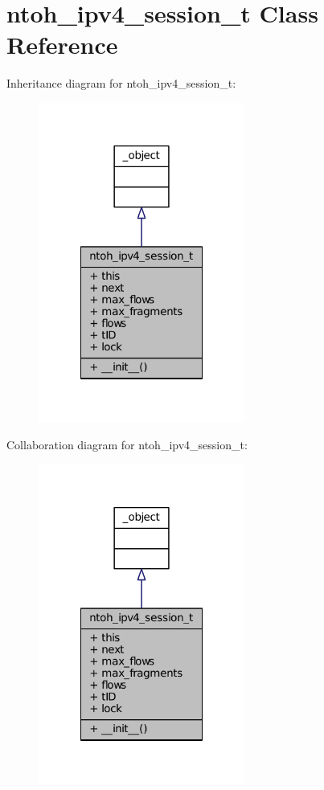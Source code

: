 \hypertarget{classlibntoh_1_1ntoh__ipv4__session__t}{\section{ntoh\-\_\-ipv4\-\_\-session\-\_\-t Class Reference}
\label{classlibntoh_1_1ntoh__ipv4__session__t}
}


Inheritance diagram for ntoh\-\_\-ipv4\-\_\-session\-\_\-t\-:
\nopagebreak
\begin{figure}[H]
\begin{center}
\leavevmode
\includegraphics[width=192pt]{classlibntoh_1_1ntoh__ipv4__session__t__inherit__graph}
\end{center}
\end{figure}


Collaboration diagram for ntoh\-\_\-ipv4\-\_\-session\-\_\-t\-:
\nopagebreak
\begin{figure}[H]
\begin{center}
\leavevmode
\includegraphics[width=192pt]{classlibntoh_1_1ntoh__ipv4__session__t__coll__graph}
\end{center}
\end{figure}
